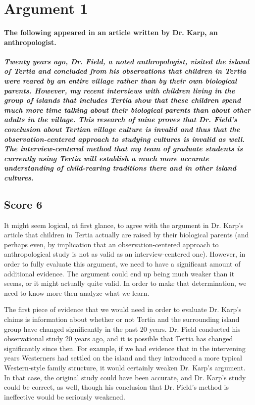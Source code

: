 \section{Argument 1}
\paragraph{The following appeared in an article written by Dr. Karp, an anthropologist.}
\subparagraph{Twenty years ago, Dr. Field, a noted anthropologist, visited the island of Tertia and concluded from his observations that children in Tertia were reared by an entire village rather than by their own biological parents.
However, my recent interviews with children living in the group of islands that includes Tertia show that these children spend much more time talking about their biological parents than about other adults in the village.
This research of mine proves that Dr. Field's conclusion about Tertian village culture is invalid and thus that the observation-centered approach to studying cultures is invalid as well.
The interview-centered method that my team of graduate students is currently using Tertia will establish a much more accurate understanding of child-rearing traditions there and in other island cultures.}


\subsection{Score 6}
It might seem logical, at first glance, to agree with the argument in Dr. Karp's article that children in Tertia actually are raised by their biological parents (and perhaps even, by implication that an observation-centered approach to anthropological study is not as valid as an interview-centered one).
However, in order to fully evaluate this argument, we need to have a significant amount of additional evidence.
The argument could end up being much weaker than it seems, or it might actually quite valid.
In order to make that determination, we need to know more then analyze what we learn.

The first piece of evidence that we would need in order to evaluate Dr. Karp's claims is information about whether or not Tertia and the surrounding island group have changed significantly in the past 20 years.
Dr. Field conducted his observational study 20 years ago, and it is possible that Tertia has changed significantly since then.
For example, if we had evidence that in the intervening years Westerners had settled on the island and they introduced a more typical Western-style family structure, it would certainly weaken Dr. Karp's argument.
In that case, the original study could have been accurate, and Dr. Karp's study could be correct, as well, though his conclusion that Dr. Field's method is ineffective would be seriously weakened.

